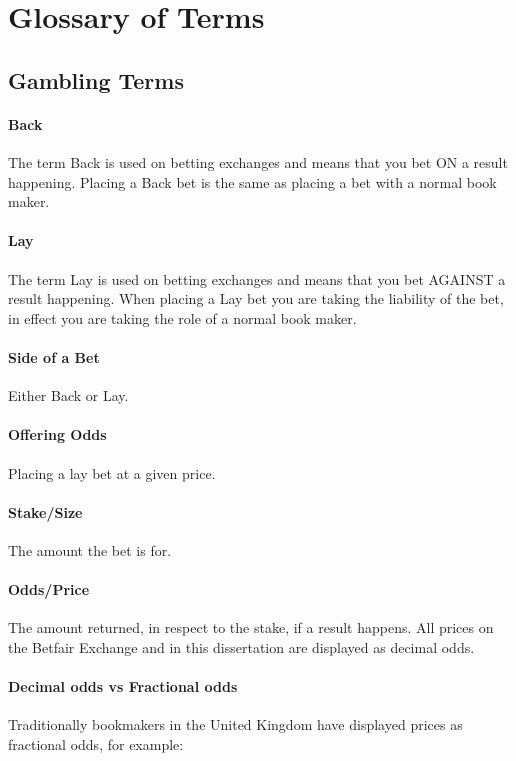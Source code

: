 	\chapter{Glossary of Terms}
	\label{appendix:glossaryOfTerms}
	
		\section{Gambling Terms}
	
		\subsubsection{Back}
		The term Back is used on betting exchanges and means that you bet ON a result happening. Placing a Back bet is the same as placing a bet with a normal book maker.
	
		\subsubsection{Lay}
		The term Lay is used on betting exchanges and means that you bet AGAINST a result happening. When placing a Lay bet you are taking the liability of the bet, in effect you are taking the role of a normal book maker.
		
		\subsubsection{Side of a Bet}
		Either Back or Lay.

		\subsubsection{Offering Odds}
		Placing a lay bet at a given price.
	
		\subsubsection{Stake/Size}
		The amount the bet is for.

		\subsubsection{Odds/Price}
		The amount returned, in respect to the stake, if a result happens. All prices on the Betfair Exchange and in this dissertation are displayed as decimal odds.

		\subsubsection{Decimal odds vs Fractional odds}
		Traditionally bookmakers in the United Kingdom have displayed prices as fractional odds, for example:\\


